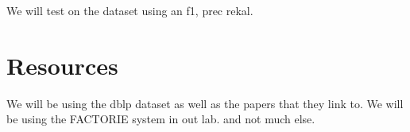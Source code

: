 \documentclass[]{article}
\begin{document}
We will test on the dataset using an f1, prec rekal.

\section{Resources} %
\label{sec:resources}
We will be using the dblp dataset as well as the papers that they link to. We will be using the FACTORIE system in out lab. and not much else.



\end{document}
